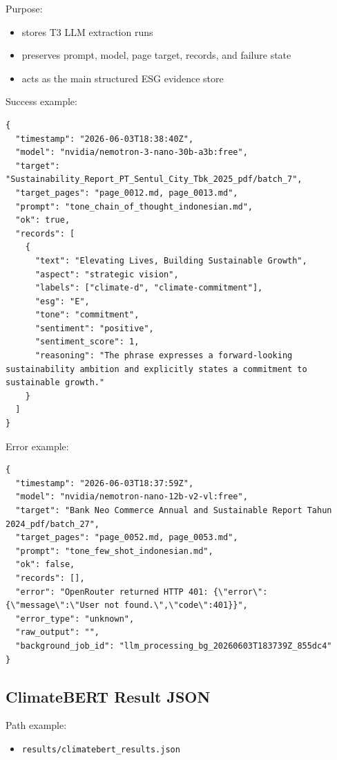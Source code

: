 \documentclass[12pt,a4paper]{report}
\providecommand{\tightlist}{\setlength{\itemsep}{0pt}\setlength{\parskip}{0pt}}
\begin{document}
Purpose:

\begin{itemize}
\tightlist
\item
  stores T3 LLM extraction runs
\item
  preserves prompt, model, page target, records, and failure state
\item
  acts as the main structured ESG evidence store
\end{itemize}

Success example:

\begin{verbatim}
{
  "timestamp": "2026-06-03T18:38:40Z",
  "model": "nvidia/nemotron-3-nano-30b-a3b:free",
  "target": "Sustainability_Report_PT_Sentul_City_Tbk_2025_pdf/batch_7",
  "target_pages": "page_0012.md, page_0013.md",
  "prompt": "tone_chain_of_thought_indonesian.md",
  "ok": true,
  "records": [
    {
      "text": "Elevating Lives, Building Sustainable Growth",
      "aspect": "strategic vision",
      "labels": ["climate-d", "climate-commitment"],
      "esg": "E",
      "tone": "commitment",
      "sentiment": "positive",
      "sentiment_score": 1,
      "reasoning": "The phrase expresses a forward-looking sustainability ambition and explicitly states a commitment to sustainable growth."
    }
  ]
}
\end{verbatim}

Error example:

\begin{verbatim}
{
  "timestamp": "2026-06-03T18:37:59Z",
  "model": "nvidia/nemotron-nano-12b-v2-vl:free",
  "target": "Bank Neo Commerce Annual and Sustainable Report Tahun 2024_pdf/batch_27",
  "target_pages": "page_0052.md, page_0053.md",
  "prompt": "tone_few_shot_indonesian.md",
  "ok": false,
  "records": [],
  "error": "OpenRouter returned HTTP 401: {\"error\":{\"message\":\"User not found.\",\"code\":401}}",
  "error_type": "unknown",
  "raw_output": "",
  "background_job_id": "llm_processing_bg_20260603T183739Z_855dc4"
}
\end{verbatim}

\subsection{ClimateBERT Result JSON}\label{climatebert-result-json}

Path example:

\begin{itemize}
\tightlist
\item
  \texttt{results/climatebert\_results.json}
\end{itemize}
\end{document}
